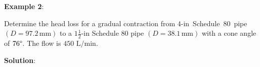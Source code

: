 \documentclass[10pt, one-sided]{amsart}
\begin{document}
\begin{multicols}{2}
\newpage
\raggedright 


\columnbreak
	


\textbf{Example 2}:

Determine the head loss for a gradual contraction from $4\text{-in}$~Schedule~$80$~pipe $(D=97.2\,\text{mm})$ to a
$1\tfrac{1}{2}\text{-in}$ Schedule $80$ pipe $(D=38.1\,\text{mm})$ with a cone angle of $76\degree$. 
\lb The flow is $450\text{ L/min}$.

\textbf{Solution}:
	

\end{multicols}
\end{document}

